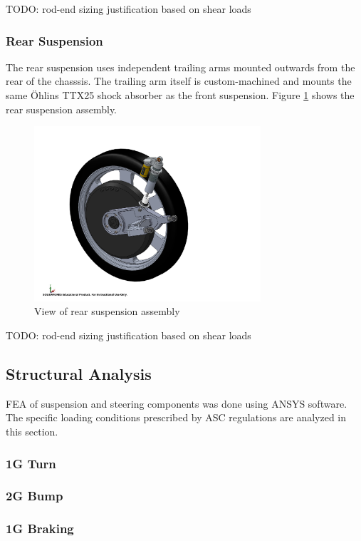 \documentclass[10pt]{article}
\begin{document}
TODO: rod-end sizing justification based on shear loads

\subsubsection{Rear Suspension}
The rear suspension uses independent trailing arms mounted outwards from the rear of the chasssis. The trailing arm itself is custom-machined and mounts the same \"Ohlins TTX25 shock absorber as the front suspension. Figure \ref{fig:rear-suspension} shows the rear suspension assembly.

\begin{figure}
\centering
\includegraphics[width=0.75\textwidth]{figures/rear-suspension}
\caption{View of rear suspension assembly}
\label{fig:rear-suspension}
\end{figure}

TODO: rod-end sizing justification based on shear loads

\subsection{Structural Analysis}
FEA of suspension and steering components was done using ANSYS software. The specific loading conditions prescribed by ASC regulations are analyzed in this section.

\subsubsection{1G Turn}

\subsubsection{2G Bump}

\subsubsection{1G Braking}
\end{document}
